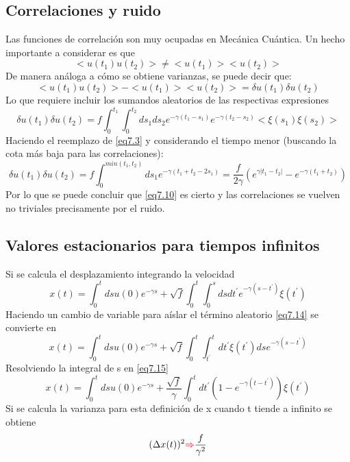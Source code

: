 \documentclass{book}
\begin{document}
\subsection{Correlaciones y ruido}
Las funciones de correlación son muy ocupadas en Mecánica Cuántica. Un hecho importante a considerar es que 
\begin{equation}\label{eq7.10} <u(t_1)u(t_2)>\neq<u(t_1)><u(t_2)>\end{equation}
De manera análoga a cómo se obtiene varianzas, se puede decir que:
\begin{equation}\label{eq7.11}<u(t_1)u(t_2)>-<u(t_1)><u(t_2)>=\delta u(t_1)\delta u(t_2)\end{equation}
Lo que requiere incluir los sumandos aleatorios de las respectivas expresiones
\begin{equation}\label{eq7.12}\delta u(t_1)\delta u(t_2)=f\int_0^{t_1}\int_0^{t_2}ds_1 ds_2 e^{-\gamma(t_1-s_1)}e^{-\gamma(t_2-s_2)}<\xi(s_1)\xi(s_2)>\end{equation}
Haciendo el reemplazo de \ref{eq7.3} y considerando el tiempo menor (buscando la cota más baja para las correlaciones):
\begin{equation}\label{eq7.13}\delta u(t_1)\delta u(t_2)=f\int_{0}^{min(t_1,t_2)}ds_1 e^{-\gamma(t_1+t_2-2s_1)}=\frac{f}{2\gamma}(e^{\gamma\lvert t_1-t_2\rvert}-e^{-\gamma(t_1+t_2)})\end{equation}
Por lo que se puede concluir que \ref{eq7.10} es cierto y las correlaciones se vuelven no triviales precisamente por el ruido.
\subsection{Valores estacionarios para tiempos infinitos}
Si se calcula el desplazamiento integrando la velocidad
\begin{equation}\label{eq7.14}x(t)=\int_0^t ds u(0)e^{-\gamma s}+\sqrt{f}\int_0^t\int_0^s ds dt^\prime e^{-\gamma(s-t^\prime)} \xi(t^\prime)\end{equation}
Haciendo un cambio de variable para aíslar el término aleatorio \ref{eq7.14} se convierte en 
\begin{equation}\label{eq7.15}x(t)=\int_0^t ds u(0)e^{-\gamma s}+\sqrt{f}\int_0^t \int_{t^\prime}^t dt^\prime \xi(t^\prime) ds e^{-\gamma (s-t^\prime)}\end{equation}
Resolviendo la integral de s en \ref{eq7.15}\begin{equation}\label{eq7.16}x(t)=\int_0^t ds u(0)e^{-\gamma s}+\frac{\sqrt{f}}{\gamma}\int_0^t d t^\prime (1-e^{-\gamma(t-t^\prime)})\xi(t^\prime)\end{equation} Si se calcula la varianza para esta definición de x cuando t tiende a infinito se obtiene
\begin{equation}\label{eq7.17} (\Delta x(t))^2 \textcolor{red}{\Rightarrow} \frac{f}{\gamma^2}\end{equation}
\end{document}
